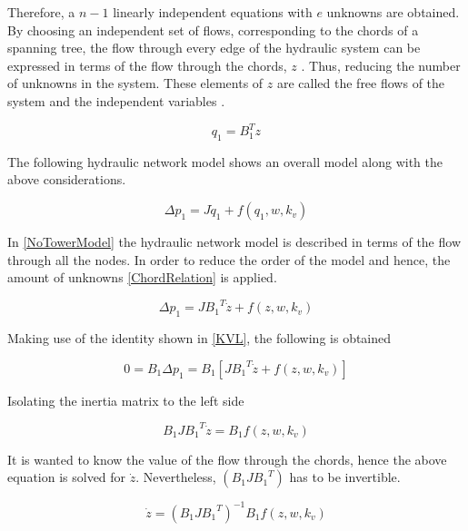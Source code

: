 Therefore, a $n-1$ linearly independent equations with $e$ unknowns are obtained. By choosing an independent set of flows, corresponding to the chords of a spanning tree, the 
flow through every edge of the hydraulic system can be expressed in terms of the flow through the chords, $z$ \cite{GraphModel}. Thus, reducing the
number of unknowns in the system. These elements of $z$ are called the free 
flows of the system and the independent variables \cite{GraphTheoryCarsten}.

\begin{equation}
  q_1 = B_1 ^{T}  z
  \label{ChordRelation}
\end{equation}

The following hydraulic network model shows an overall model along with the above considerations. 

\begin{equation}
  \Delta p_1 = J \dot{q}_1 + f(q_1, w, k_v)
  \label{NoTowerModel}
\end{equation}

In \eqref{NoTowerModel} the hydraulic network model is described in terms of the 
flow through all the nodes. In order to reduce the order of the model and hence, 
the amount of unknowns \eqref{ChordRelation} is applied. 

\begin{equation}
  \Delta p_1 = J {B_1}^T \dot{z} + f(z, w, k_v)
  \label{ChordsModel}
\end{equation}

Making use of the identity shown in \eqref{KVL}, the following is obtained

\begin{equation}
  0 = B_1 \Delta p_1 = B_1 [J {B_1}^T \dot{z} + f(z, w, k_v)] 
 \end{equation}

Isolating the inertia matrix to the left side

\begin{equation}
  B_1 J {B_1}^T \dot{z}  = B_1 f(z, w, k_v)
 \end{equation}

It is wanted to know the value of the flow through the chords, hence the above equation is solved 
for $\dot{z}$. Nevertheless, $(B_1 J {B_1}^T)$ has to be invertible.


\begin{equation}
   \dot{z}  = (B_1 J {B_1}^T)^{-1}B_1 f(z, w, k_v)
   \label{ParatModelFinal}
 \end{equation}


